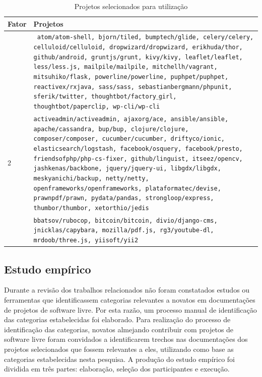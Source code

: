 \begin{table}
\caption{Projetos selecionados para utilização}
\label{tab:projetos-selecionados}
\centering
\small
\begin{tabularx}{\textwidth}{>{\hsize=0.05\hsize}X >{\hsize=0.95\hsize}X}
\midrule
\textbf{Fator} & \textbf{Projetos} \\
\midrule
1 & 
\texttt{
atom/atom-shell,
bjorn/tiled,
bumptech/glide,
celery/celery,
celluloid/celluloid,
dropwizard/dropwizard,
erikhuda/thor,
github/android,
gruntjs/grunt,
kivy/kivy,
leaflet/leaflet,
less/less.js,
mailpile/mailpile,
mitchellh/vagrant,
mitsuhiko/flask,
powerline/powerline,
puphpet/puphpet,
reactivex/rxjava,
sass/sass,
sebastianbergmann/phpunit,
sferik/twitter,
thoughtbot/factory$\_$girl,
thoughtbot/paperclip,
wp-cli/wp-cli}
\\
\rowcolor{gray}
2 &
\texttt{activeadmin/activeadmin,
ajaxorg/ace,
ansible/ansible,
apache/cassandra,
bup/bup,
clojure/clojure,
composer/composer,
cucumber/cucumber,
driftyco/ionic,
elasticsearch/logstash,
facebook/osquery,
facebook/presto,
friendsofphp/php-cs-fixer,
github/linguist,
itseez/opencv,
jashkenas/backbone,
jquery/jquery-ui,
libgdx/libgdx,
meskyanichi/backup,
netty/netty,
openframeworks/openframeworks,
plataformatec/devise,
prawnpdf/prawn,
pydata/pandas,
strongloop/express,
thumbor/thumbor,
xetorthio/jedis}
\\
3 &
\texttt{bbatsov/rubocop,
bitcoin/bitcoin,
divio/django-cms,
jnicklas/capybara,
mozilla/pdf.js,
rg3/youtube-dl,
mrdoob/three.js,
yiisoft/yii2}
\end{tabularx}
\end{table}

\subsection{Estudo empírico}
\label{sec:estudo-empirico}
Durante a revisão dos trabalhos relacionados não foram constatados estudos ou ferramentas que identificassem categorias relevantes a novatos em documentações de projetos de software livre. Por esta razão, um processo manual de identificação das categorias estabelecidas foi elaborado. Para realização do processo de identificação das categorias, novatos almejando contribuir com projetos de software livre foram convidados a identificarem trechos nas documentações dos projetos selecionados que fossem relevantes a eles, utilizando como base as categorias estabelecidas nesta pesquisa. A produção do estudo empírico foi dividida em três partes: elaboração, seleção dos participantes e execução.

